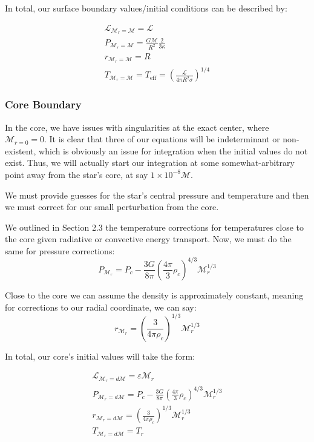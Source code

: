 \documentclass[twocolumn]{aastex631}
\begin{document}
In total, our surface boundary values/initial conditions can be described by:

\begin{equation}
\boxed{
\begin{array}{lcl}
\mathcal{L}_{\mathcal{M}_r=\mathcal{M}} = \mathcal{L}\\
P_{\mathcal{M}_r=\mathcal{M}} = \frac{G\mathcal{M}}{R^2}\frac{2}{3\kappa}\\
r_{\mathcal{M}_r=\mathcal{M}} = R\\
T_{\mathcal{M}_r=\mathcal{M}} = T_\text{eff} = \left(\frac{\mathcal{L}}{4\pi R^2 \sigma}\right)^{1/4}
\end{array}
}
\end{equation}


\subsubsection{Core Boundary}

In the core, we have issues with singularities at the exact center, where $\mathcal{M}_{r=0} = 0$. It is clear that three of our equations will be indeterminant or non-existent, which is obviously an issue for integration when the initial values do not exist. Thus, we will actually start our integration at some somewhat-arbitrary point away from the star's core, at say $1\times 10^{-8} \mathcal{M}$. 

We must provide guesses for the star's central pressure and temperature and then we must correct for our small perturbation from the core.

We outlined in Section 2.3 the temperature corrections for temperatures close to the core given radiative or convective energy transport. Now, we must do the same for pressure corrections:
\begin{equation}
	P_{\mathcal{M}_r} = P_c - \frac{3G}{8\pi}\left(\frac{4\pi}{3}\rho_c\right)^{4/3}\mathcal{M}_r^{1/3}
\end{equation}

Close to the core we can assume the density is approximately constant, meaning for corrections to our radial coordinate, we can say:
\begin{equation}
	r_{\mathcal{M}_r} = \left(\frac{3}{4\pi \rho_c}\right)^{1/3}\mathcal{M}_r^{1/3}
\end{equation}

In total, our core's initial values will take the form:

\begin{equation}
\boxed{
\begin{array}{lcl}
\mathcal{L}_{\mathcal{M}_r=d\mathcal{M}} = \varepsilon \mathcal{M}_r\\
P_{\mathcal{M}_r=d\mathcal{M}} = P_c - \frac{3G}{8\pi}\left(\frac{4\pi}{3}\rho_c\right)^{4/3}\mathcal{M}_r^{1/3}\\
r_{\mathcal{M}_r=d\mathcal{M}} = \left(\frac{3}{4\pi \rho_c}\right)^{1/3}\mathcal{M}_r^{1/3}\\
T_{\mathcal{M}_r=d\mathcal{M}} = T_r
\end{array}
}
\end{equation}
\end{document}
